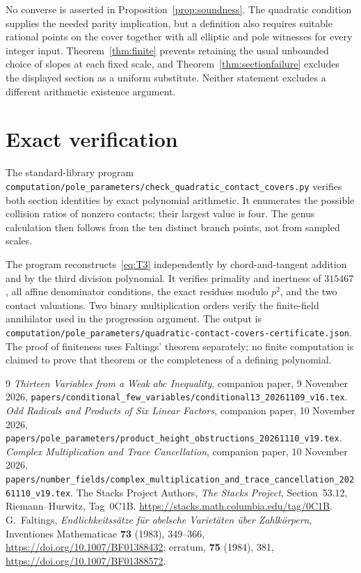 \documentclass[11pt,a4paper]{article}
\begin{document}
No converse is asserted in Proposition~\ref{prop:soundness}.
The quadratic condition supplies the needed parity implication,
but a definition also requires suitable rational points on the
cover together with all elliptic and pole witnesses for every
integer input. Theorem~\ref{thm:finite} prevents retaining the
usual unbounded choice of slopes at each fixed scale, and
Theorem~\ref{thm:sectionfailure} excludes the displayed section
as a uniform substitute. Neither statement excludes a different
arithmetic existence argument.

\section{Exact verification}

The standard-library program
\nolinkurl{computation/pole_parameters/check_quadratic_contact_covers.py}
verifies both section identities by exact polynomial arithmetic.
It enumerates the possible collision ratios of nonzero contacts;
their largest value is four. The genus calculation then follows
from the ten distinct branch points, not from sampled scales.

The program reconstructs~\eqref{eq:T3} independently by
chord-and-tangent addition and by the third division polynomial.
It verifies primality and inertness of $315467$, all affine
denominator conditions, the exact residues modulo $p^2$, and
the two contact valuations. Two binary multiplication orders
verify the finite-field annihilator used in the progression
argument. The output is
\nolinkurl{computation/pole_parameters/quadratic-contact-covers-certificate.json}.
The proof of finiteness uses Faltings' theorem separately;
no finite computation is claimed to prove that theorem or
the completeness of a defining polynomial.

\begin{thebibliography}{9}
\emph{Thirteen Variables from a Weak $abc$ Inequality},
companion paper, 9 November 2026,
\nolinkurl{papers/conditional_few_variables/conditional13_20261109_v16.tex}.
\emph{Odd Radicals and Products of Six Linear Factors},
companion paper, 10 November 2026,
\nolinkurl{papers/pole_parameters/product_height_obstructions_20261110_v19.tex}.
\emph{Complex Multiplication and Trace Cancellation},
companion paper, 10 November 2026,
\nolinkurl{papers/number_fields/complex_multiplication_and_trace_cancellation_20261110_v19.tex}.
The Stacks Project Authors, \emph{The Stacks Project},
Section~53.12, Riemann--Hurwitz, Tag~0C1B.
\url{https://stacks.math.columbia.edu/tag/0C1B}.
G.~Faltings, \emph{Endlichkeitss\"atze f\"ur abelsche Variet\"aten
\"uber Zahlk\"orpern}, Inventiones Mathematicae \textbf{73} (1983),
349--366, \url{https://doi.org/10.1007/BF01388432};
erratum, \textbf{75} (1984), 381,
\url{https://doi.org/10.1007/BF01388572}.
\end{thebibliography}
\end{document}
